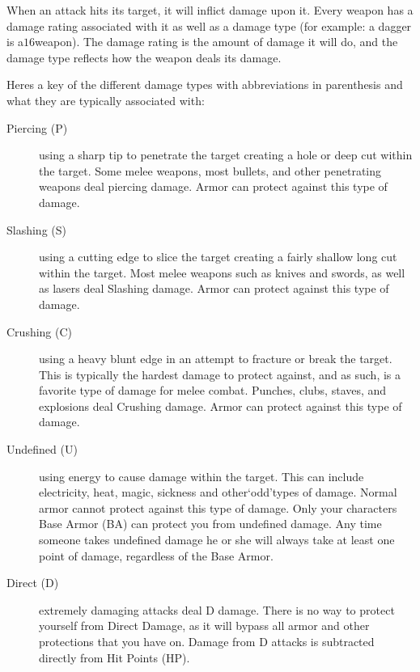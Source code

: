 \documentclass[twoside]{book}
\begin{document}
    {  
    When an attack hits its target, it will inflict damage upon it. Every weapon has a damage rating associated with it as well as a damage type (for example: a dagger is a\ensuremath{1}\ensuremath{6}\ensuremath{}weapon). The damage rating is the amount of damage it will do, and the damage type reflects how the weapon deals its damage.
    }
  
    {  
    Heres a key of the different damage types with abbreviations in parenthesis and what they are typically associated with:
    }
  
\begin{description}
    
  \item[Piercing (P)] 
    {  
    using a sharp tip to penetrate the target creating a hole or deep cut within the target. Some melee weapons, most bullets, and other penetrating weapons deal piercing damage. Armor can protect against this type of damage.
    }
  
  \item[Slashing (S)] 
    {  
    using a cutting edge to slice the target creating a fairly shallow long cut within the target. Most melee weapons such as knives and swords, as well as lasers deal Slashing damage. Armor can protect against this type of damage.
    }
  
  \item[Crushing (C)] 
    {  
    using a heavy blunt edge in an attempt to fracture or break the target. This is typically the hardest damage to protect against, and as such, is a favorite type of damage for melee combat. Punches, clubs, staves, and explosions deal Crushing damage. Armor can protect against this type of damage.
    }
  
  \item[Undefined (U)] 
    {  
    using energy to cause damage within the target. This can include electricity, heat, magic, sickness and other`odd'types of damage. Normal armor cannot protect against this type of damage. Only your characters Base Armor (BA) can protect you from undefined damage. Any time someone takes undefined damage he or she will always take at least one point of damage, regardless of the Base Armor.
    }
  
  \item[Direct (D)] 
    {  
    extremely damaging attacks deal D damage. There is no way to protect yourself from Direct Damage, as it will bypass all armor and other protections that you have on. Damage from D attacks is subtracted directly from Hit Points (HP).
    }
  
\end{description}
  
\end{document}
